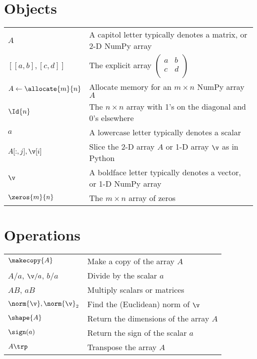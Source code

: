 \label{notation_index}

\section*{Objects}
\renewcommand{\arraystretch}{1.3}
\begin{tabular}{l l}
$A$ 					& A capitol letter typically denotes a matrix, or 2-D NumPy array\\
$[[a, b], [c, d]]$ 			& The explicit array $\left(\begin{array}{cc}
a & b\\
c & d\\\end{array}\right)$\\
$A \gets \allocate{m}{n}$ 	& Allocate memory for an $m \times n$ NumPy array $A$\\
$\Id{n}$	 			& The $n\times n$ array with 1's on the diagonal and 0's elsewhere \\
$a$ 					& A lowercase letter typically denotes a scalar\\

$A[:, j], \v[i]$ 			& Slice the 2-D array $A$ or 1-D array $\v$ as in Python\\
$\v$ 					& A boldface letter typically denotes a vector, or 1-D NumPy array\\
$\zeros{m}{n}$	 		& The $m\times n$ array of zeros 
\end{tabular}

\section*{Operations}
\begin{tabular}{l l}
$\makecopy{A}$		& Make a copy of the array $A$\\
$A/a$, $\v/a$, $b/a$ 		& Divide by the scalar $a$\\
$AB$, $aB$			& Multiply scalars or matrices\\
$\norm{\v}, \norm{\v}_2$ 		& Find the (Euclidean) norm of $\v$\\
$\shape{A}$			& Return the dimensions of the array $A$\\
$\sign(a)$				& Return the sign of the scalar $a$\\
$A\trp$				& Transpose the array $A$
\end{tabular}

